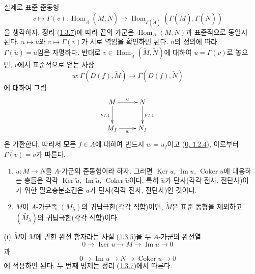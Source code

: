 실제로 표준 준동형
\[
  v\longmapsto\Gamma(v):
  \operatorname{Hom}_{\widetilde{A}}(\widetilde{M},\widetilde{N})
  \longrightarrow
  \operatorname{Hom}_{\Gamma(\widetilde{A})}
  (\Gamma(\widetilde{M}),\Gamma(\widetilde{N}))
\]
을 생각하자. 정리 (\hyperref[I.1.3.7-ko]{1.3.7})에 따라 끝의
가군은 $\operatorname{Hom}_A(M,N)$과 표준적으로 동일시된다.
$u\mapsto\widetilde{u}$와 $v\mapsto\Gamma(v)$가 서로 역임을 확인하면
된다. $\widetilde{u}$의 정의에 따라
$\Gamma(\widetilde{u})=u$임은 자명하다. 반대로
$v\in\operatorname{Hom}_{\widetilde{A}}(\widetilde{M},\widetilde{N})$에
대하여 $u=\Gamma(v)$로 놓으면, $v$에서 표준적으로 얻는 사상
\[
  w:\Gamma(D(f),\widetilde{M})\longrightarrow
  \Gamma(D(f),\widetilde{N})
\]
에 대하여 그림
\[
  \xymatrix{
    M\ar[r]^u\ar[d]_{\rho_{f,1}} & N\ar[d]^{\rho_{f,1}}\\
    M_f\ar[r]_w & N_f
  }
\]
은 가환한다. 따라서 모든 $f\in A$에 대하여 반드시 $w=u_f$이고
(\hyperref[0.1.2.4-ko]{0, 1.2.4}), 이로부터
$\widetilde{\Gamma(v)}=v$가 따른다.

\begin{corollary}[1.3.9]
\label{I.1.3.9-ko}
\begin{enumerate}
  \item[\rm(i)] $u:M\to N$을 $A$-가군의 준동형이라 하자. 그러면
  $\operatorname{Ker}u$, $\operatorname{Im}u$,
  $\operatorname{Coker}u$에 대응하는 층들은 각각
  $\operatorname{Ker}\widetilde{u}$,
  $\operatorname{Im}\widetilde{u}$,
  $\operatorname{Coker}\widetilde{u}$이다. 특히 $\widetilde{u}$가
  단사(각각 전사, 전단사)이기 위한 필요충분조건은 $u$가
  단사(각각 전사, 전단사)인 것이다.
  \item[\rm(ii)] $M$이 $A$-가군족 $(M_\lambda)$의
  귀납극한(각각 직합)이면, $\widetilde{M}$은 표준 동형을 제외하고
  $(\widetilde{M_\lambda})$의 귀납극한(각각 직합)이다.
\end{enumerate}
\end{corollary}

(i) $\widetilde{M}$이 $M$에 관한 완전 함자라는 사실
(\hyperref[I.1.3.5-ko]{1.3.5})을 두 $A$-가군의 완전열
\[
  0\to\operatorname{Ker}u\to M\to\operatorname{Im}u\to0
\]
과
\[
  0\to\operatorname{Im}u\to N\to\operatorname{Coker}u\to0
\]
에 적용하면 된다. 두 번째 명제는 정리
(\hyperref[I.1.3.7-ko]{1.3.7})에서 따른다.


